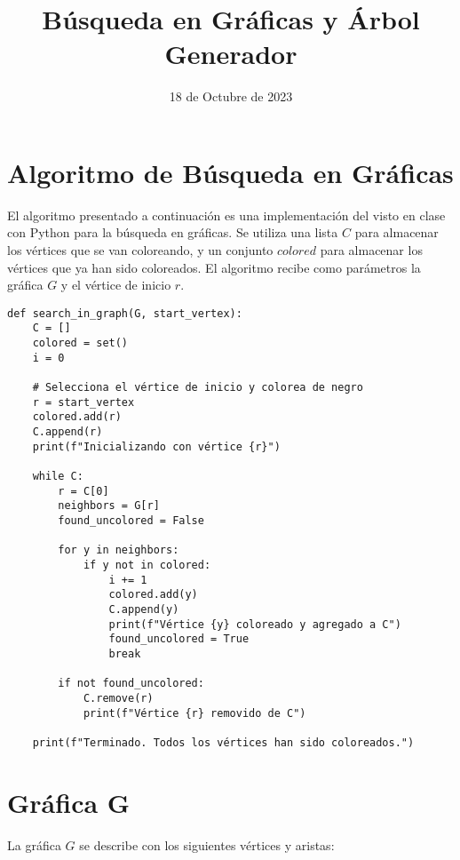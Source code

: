 \documentclass{article}
\title{Búsqueda en Gráficas y Árbol Generador}
\date{18 de Octubre de 2023}
\begin{document}
\maketitle

\section{Algoritmo de Búsqueda en Gráficas}

El algoritmo presentado a continuación es una implementación del visto en clase con Python para la búsqueda en gráficas. Se utiliza una lista \( C \) para almacenar los vértices que se van coloreando, y un conjunto \( colored \) para almacenar los vértices que ya han sido coloreados. El algoritmo recibe como parámetros la gráfica \( G \) y el vértice de inicio \( r \).

\begin{lstlisting}
def search_in_graph(G, start_vertex):
    C = []
    colored = set()
    i = 0

    # Selecciona el vértice de inicio y colorea de negro
    r = start_vertex
    colored.add(r)
    C.append(r)
    print(f"Inicializando con vértice {r}")

    while C:
        r = C[0]
        neighbors = G[r]
        found_uncolored = False
        
        for y in neighbors:
            if y not in colored:
                i += 1
                colored.add(y)
                C.append(y)
                print(f"Vértice {y} coloreado y agregado a C")
                found_uncolored = True
                break
        
        if not found_uncolored:
            C.remove(r)
            print(f"Vértice {r} removido de C")

    print(f"Terminado. Todos los vértices han sido coloreados.")
\end{lstlisting}

\section{Gráfica G}

La gráfica \( G \) se describe con los siguientes vértices y aristas:

\end{document}
